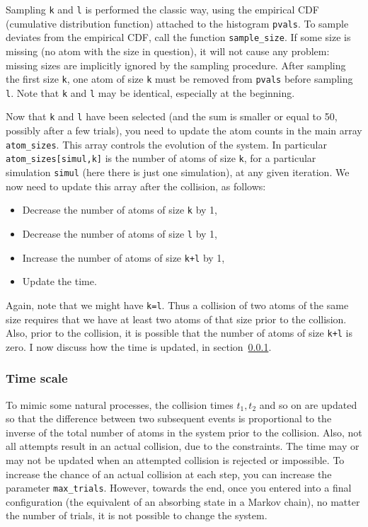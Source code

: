 \documentclass[oneside,10pt]{book}
\begin{document}
Sampling \texttt{k} and \texttt{l} is performed the classic way, using the empirical CDF (cumulative distribution function) attached to the histogram
 \texttt{pvals}. To sample deviates from the empirical CDF, call the
 function \texttt{sample\_size}. If some size is missing (no atom with the size in question), it will not cause any problem:
 missing sizes are implicitly ignored by the sampling procedure. After sampling the first size \texttt{k}, one atom of size
\texttt{k} must be removed from \texttt{pvals} before sampling \texttt{l}. Note that \texttt{k} and \texttt{l} may be identical, especially at the beginning.

Now that \texttt{k} and \texttt{l} have been selected (and the sum is smaller or equal to 50, possibly after a few trials), you need to update the atom counts in the main array \texttt{atom\_sizes}. This array controls the evolution of the system. In particular \texttt{atom\_sizes[simul,k]} is the number of atoms of size \texttt{k}, for a particular simulation
\texttt{simul} (here there is just one simulation),
 at any given iteration. We now need to update this array after the collision, as follows:\vspace{1ex}
\begin{itemize}
\item Decrease the number of atoms of size \texttt{k} by 1,
\item Decrease the number of atoms of size \texttt{l} by 1,
\item Increase the number of atoms of size \texttt{k+l} by 1,
\item Update the time.
\end{itemize}
Again, note that we might have \texttt{k=l}. Thus a collision of two atoms of the same size requires that we have at least two atoms of that size prior to the collision. Also, prior to the collision, it is possible that the number of
atoms of size \texttt{k+l} is zero. I now discuss how the time is updated, in section~\ref{timul}.

\subsubsection{Time scale}\label{timul}

To mimic some natural processes, the collision times $t_1,t_2$ and so on are updated so that the difference between two
 subsequent events is proportional to the inverse of the total number of atoms in the system prior to the collision.
Also, not all attempts result in an actual collision, due to the constraints. The time may or may not be updated when
 an attempted collision is rejected or impossible. To increase the chance of an actual collision at each step, you
 can increase the parameter \texttt{max\_trials}. However, towards the end, once you entered into a final configuration
 (the equivalent of an absorbing state in a Markov chain), no matter the number of trials, it is not possible to change the system.
\end{document}
